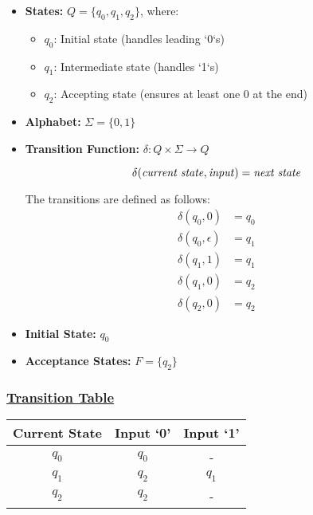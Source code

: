 \documentclass[12pt]{article}
\begin{document}
	\begin{itemize}[leftmargin=*]
		\item \textbf{States:} \(Q = \{q_0, q_1, q_2\}\), where:
		\begin{itemize}
			\item \(q_0\): Initial state (handles leading `0`s)
			\item \(q_1\): Intermediate state (handles `1`s)
			\item \(q_2\): Accepting state (ensures at least one 0 at the end)
		\end{itemize}
		
		\item \textbf{Alphabet:} \(\Sigma = \{0,1\}\)
		
		\item \textbf{Transition Function:} \(\delta: Q \times \Sigma \to Q\)
		
		\begin{mdframed}[linewidth=1pt, leftmargin=3cm, rightmargin=3.2cm]
			\[\delta(\text{\textit{current state}}, \text{\textit{input}}) = \text{\textit{next state}}\]
		\end{mdframed}
		
		The transitions are defined as follows:
		\begin{align*}
			\delta(q_0, 0) &= q_0 \\
			\delta(q_0, \epsilon) &= q_1 \\
			\delta(q_1, 1) &= q_1 \\
			\delta(q_1, 0) &= q_2 \\
			\delta(q_2, 0) &= q_2
		\end{align*}
		
		\item \textbf{Initial State:} \(q_0\)
		
		\item \textbf{Acceptance States:} \(F = \{q_2\}\)
	\end{itemize}
	
	\subsubsection*{\underline{Transition Table}}
	\begin{center}
		\begin{tabular}{ccc}
			\toprule
			\textbf{Current State} & \textbf{Input `0'} & \textbf{Input `1'} \\
			\midrule
			$q_0$ & $q_0$ & - \\
			$q_1$ & $q_2$ & $q_1$ \\
			$q_2$ & $q_2$ & - \\
			\bottomrule
		\end{tabular}
	\end{center}
	
\end{document}
